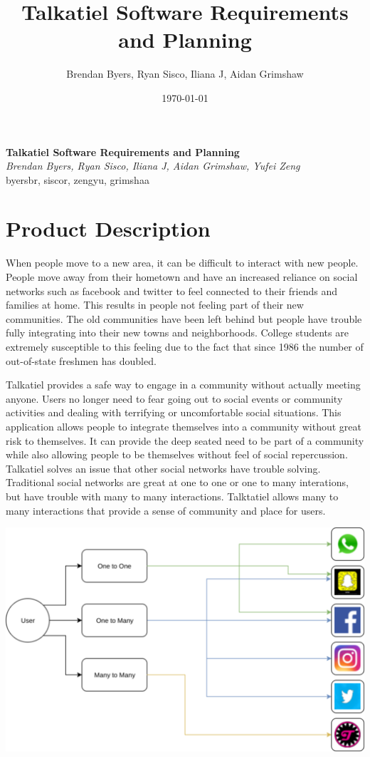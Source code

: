 \documentclass[12pt]{article}
\title{Talkatiel Software Requirements and Planning}
\author{Brendan Byers, Ryan Sisco, Iliana J, Aidan Grimshaw}
\date{\today}
\begin{document}
\begin{center}
      \Large\textbf{Talkatiel Software Requirements and Planning}\\
      \large\textit{Brendan Byers, Ryan Sisco, Iliana J, Aidan Grimshaw, Yufei Zeng}\\
      \large{byersbr, siscor, zengyu, grimshaa}\\
   \end{center}

\tableofcontents

\section{Product Description}
  When people move to a new area, it can be difficult to interact with new people.  People move away from their hometown and have an increased reliance on social networks such as facebook and twitter to feel connected to their friends and families at home.  This results in people not feeling part of their new communities.  The old communities have been left behind but people have trouble fully integrating into their new towns and neighborhoods.  College students are extremely susceptible to this feeling due to the fact that since 1986 the number of out-of-state freshmen has doubled\cite{item2}.

  Talkatiel provides a safe way to engage in a community without actually meeting anyone.  Users no longer need to fear going out to social events or community activities and dealing with terrifying or uncomfortable social situations.  This application allows people to integrate themselves into a community without great risk to themselves.  It can provide the deep seated need to be part of a community while also allowing people to be themselves without feel of social repercussion.  Talkatiel solves an issue that other social networks have trouble solving.  Traditional social networks are great at one to one or one to many interations, but have trouble with many to many interactions.  Talktatiel allows many to many interactions that provide a sense of community and place for users.

  \includegraphics[scale=0.75]{similarServices}
\end{document}
